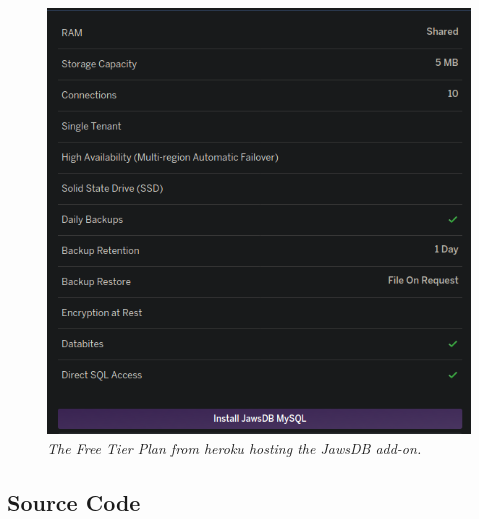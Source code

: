 \documentclass[a4paper,11pt]{proc}
\begin{document}
\begin{figure}[p]
	\centering
	\includegraphics[width=17.2cm]{JawsPlan.png}
	\caption{\textit{The Free Tier Plan from heroku hosting the JawsDB add-on.}}
\end{figure}
\FloatBarrier
\subsection{Source Code}
\end{document}
